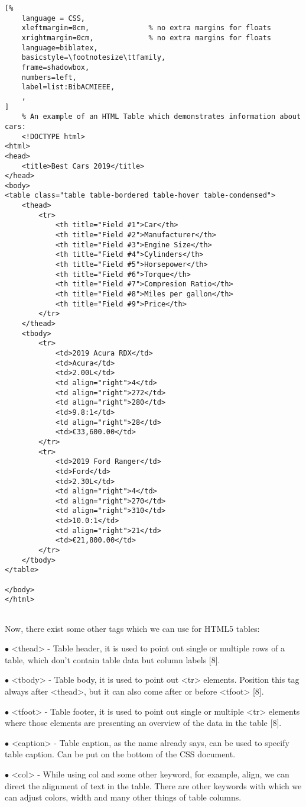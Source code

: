 \begin{lstlisting}[%
    language = CSS, 
    xleftmargin=0cm,              % no extra margins for floats
    xrightmargin=0cm,             % no extra margins for floats
    language=biblatex,
    basicstyle=\footnotesize\ttfamily,
    frame=shadowbox,
    numbers=left,
    label=list:BibACMIEEE,
    ,
]
    % An example of an HTML Table which demonstrates information about cars:
    <!DOCTYPE html>
<html>
<head>
	<title>Best Cars 2019</title>
</head>
<body>
<table class="table table-bordered table-hover table-condensed">
	<thead>
		<tr>
			<th title="Field #1">Car</th>
			<th title="Field #2">Manufacturer</th>
			<th title="Field #3">Engine Size</th>
			<th title="Field #4">Cylinders</th>
			<th title="Field #5">Horsepower</th>
			<th title="Field #6">Torque</th>
			<th title="Field #7">Compresion Ratio</th>
			<th title="Field #8">Miles per gallon</th>
			<th title="Field #9">Price</th>
		</tr>
	</thead>
	<tbody>
		<tr>
			<td>2019 Acura RDX</td>
			<td>Acura</td>
			<td>2.00L</td>
			<td align="right">4</td>
			<td align="right">272</td>
			<td align="right">280</td>
			<td>9.8:1</td>
			<td align="right">28</td>
			<td>€33,600.00</td>
		</tr>
		<tr>
			<td>2019 Ford Ranger</td>
			<td>Ford</td>
			<td>2.30L</td>
			<td align="right">4</td>
			<td align="right">270</td>
			<td align="right">310</td>
			<td>10.0:1</td>
			<td align="right">21</td>
			<td>€21,800.00</td>
		</tr>
	</tbody>
</table>

</body>
</html>
    
\end{lstlisting}

Now, there exist some other tags which we can use for HTML5 tables:

$\bullet$ <thead> - Table header, it is used to point out single or multiple rows 
of a table, which don't contain table data but column labels [8].

$\bullet$ <tbody> - Table body, it is used to point out <tr> elements. Position this tag
always after <thead>, but it can also come after or before <tfoot> [8].

$\bullet$ <tfoot> - Table footer, it is used to point out single or multiple <tr> elements
where those elements are presenting an overview  of the data in the table [8]. 

$\bullet$ <caption> - Table caption, as the name already says, can be used to specify table caption.
Can be put on the bottom of the CSS document.

$\bullet$ <col> - While using col and some other keyword, for example, align, we can direct
the alignment of text in the table. There are other keywords with which we can adjust colors, width
and many other things of table columns.  
 

